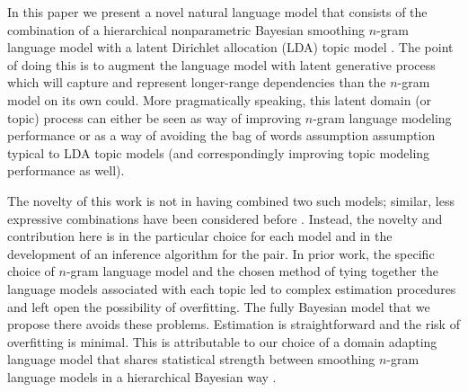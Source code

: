 



In this paper we present a novel natural language model that consists of the combination of a hierarchical nonparametric Bayesian smoothing $n$-gram language model with a latent Dirichlet allocation (LDA) topic model \cite{Blei2003a}.  The point of doing this is to augment the language model with latent generative process which will capture and represent longer-range dependencies than the $n$-gram model on its own could.  More pragmatically speaking, this latent domain (or topic) process can either be seen as way of improving $n$-gram language modeling performance or as a way of avoiding the bag of words assumption assumption typical to LDA topic models (and correspondingly improving topic modeling performance as well).  

The novelty of this work is not in having combined two such models; similar, less expressive combinations have been considered before \cite{Wallach2006}.  Instead, the novelty and contribution here is in the particular choice for each model and in the development of an inference algorithm for the pair.  In prior work, the specific choice of  $n$-gram language model and the chosen method of tying together the language models associated with each topic led to complex estimation procedures and left open the possibility of overfitting.  The fully Bayesian model that we propose there avoids these problems.   Estimation is straightforward and the risk of overfitting is minimal.   This is attributable to our choice of a domain adapting language model that shares statistical strength between smoothing $n$-gram language models in a hierarchical Bayesian way \cite{Wood2009}.   

